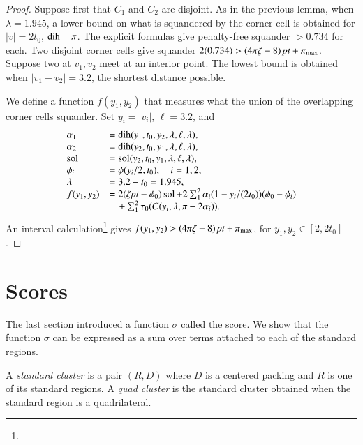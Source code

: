 \begin{proof}
Suppose first that $C_1$ and $C_2$ are disjoint.
As in the previous lemma, when $\lambda=1.945$, a lower bound on
what is squandered by the corner cell is obtained for  $|v|=2t_0$,
$\operatorname{dih}=\pi$. The explicit formulas give penalty-free squander
$>0.734$ for each. Two disjoint corner cells give
squander $ 2(0.734) >(4\pi\zeta-8)\,\hbox{\it pt} +\pi_{\max}$.  
Suppose two at $v_1,v_2$ meet at an
interior point. The lowest bound is obtained when $|v_1-v_2|=3.2$,
the shortest distance possible.

We define a function $f(y_1,y_2)$ that measures what the union of the
overlapping corner cells squander.  Set $y_i = |v_i|$, $\ell=3.2$, and
    $$
    \begin{array}{lll}
    \alpha_1 &= \operatorname{dih}(y_1,t_0,y_2,\lambda,\ell,\lambda),\\
    \alpha_2 &= \operatorname{dih}(y_2,t_0,y_1,\lambda,\ell,\lambda),\\
    \operatorname{sol} &= \operatorname{sol}(y_2,t_0,y_1,\lambda,\ell,\lambda),\\
    \phi_i &= \phi(y_i/2,t_0),\quad i=1,2,\\
    \lambda&=3.2-t_0=1.945,\\
    f(y_1,y_2)&=
    2(\zeta\hbox{\it pt}-\phi_0)\operatorname{sol}+
    2\sum_1^2 \alpha_i(1-y_i/(2t_0))(\phi_0-\phi_i)\\
        &\quad +\sum_1^2 \tau_0(C(y_i,\lambda,\pi-2\alpha_i)).
    \end{array}
    $$
An interval calculation\footnote{} %
gives $f(y_1,y_2)>(4\pi\zeta-8)\,\hbox{\it pt}+\pi_{\max}$, for $y_1,y_2\in[2,2t_0]$.
\end{proof}




\section{Scores}
\label{sec:ssc}

The last section introduced a function $\sigma$ called the score.
We show that the function $\sigma$ can be expressed as a sum over
terms attached to each of the standard regions.

\begin{definition} \label{def:standard-cluster}
A {\it standard cluster\/} is a pair $(R,D)$ where $D$ is a
centered packing and $R$ is one of its standard regions.  A {\it
quad cluster\/} is the standard cluster obtained when the standard
region is a quadrilateral.
\end{definition}
%

